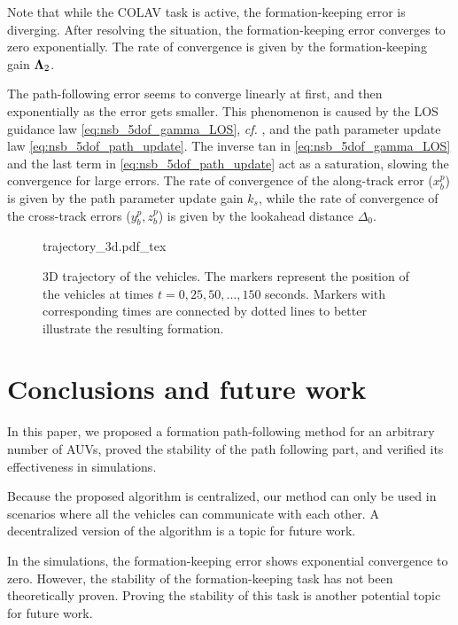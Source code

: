 Note that while the COLAV task is active, the formation-keeping error is diverging.
After resolving the situation, the formation-keeping error converges to zero exponentially.
The rate of convergence is given by the formation-keeping gain $\bm{\Lambda}_2$.

The path-following error seems to converge linearly at first, and then exponentially as the error gets smaller.
This phenomenon is caused by the LOS guidance law \eqref{eq:nsb_5dof_gamma_LOS}, \emph{cf.} \cite{fossen_uniform_2014}, and the path parameter update law \eqref{eq:nsb_5dof_path_update}.
The inverse tan in \eqref{eq:nsb_5dof_gamma_LOS} and the last term in \eqref{eq:nsb_5dof_path_update} act as a saturation, slowing the convergence for large errors.
The rate of convergence of the along-track error ($x_b^p$) is given by the path parameter update gain $k_{s}$, while the rate of convergence of the cross-track errors ($y_b^p, z_b^p$) is given by the lookahead distance $\Delta_0$.

\begin{figure}[t]
    \centering
    \def\svgwidth{.8\textwidth}
    {trajectory_3d.pdf_tex}
    \vspace{-6.5mm}
    \caption{3D trajectory of the vehicles. The markers represent the position of the vehicles at times $t = 0, 25, 50, \ldots, 150$ seconds. Markers with corresponding times are connected by dotted lines to better illustrate the resulting formation.}
    \label{fig:nsb_5dof_trajectory}
    \vspace*{-8mm}
\end{figure}

\section{Conclusions and future work}
\label{sec:nsb_5dof_conclusion}


In this paper, we proposed a formation path-following method for an arbitrary number of AUVs, proved the stability of the path following part, and verified its effectiveness in simulations.

Because the proposed algorithm is centralized, our method can only be used in scenarios where all the vehicles can communicate with each other.
A decentralized version of the algorithm is a topic for future work.

In the simulations, the formation-keeping error shows exponential convergence to zero.
However, the stability of the formation-keeping task has not been theoretically proven.
Proving the stability of this task is another potential topic for future work.
